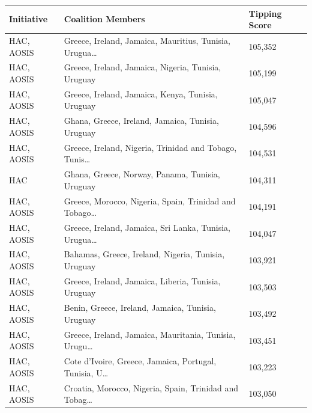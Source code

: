 \begin{tabular}{lll}
\toprule
Initiative & Coalition Members & Tipping Score \\
\midrule
HAC, AOSIS & Greece, Ireland, Jamaica, Mauritius, Tunisia, Urugua\ldots & 105,352 \\
HAC, AOSIS & Greece, Ireland, Jamaica, Nigeria, Tunisia, Uruguay & 105,199 \\
HAC, AOSIS & Greece, Ireland, Jamaica, Kenya, Tunisia, Uruguay & 105,047 \\
HAC, AOSIS & Ghana, Greece, Ireland, Jamaica, Tunisia, Uruguay & 104,596 \\
HAC, AOSIS & Greece, Ireland, Nigeria, Trinidad and Tobago, Tunis\ldots & 104,531 \\
HAC & Ghana, Greece, Norway, Panama, Tunisia, Uruguay & 104,311 \\
HAC, AOSIS & Greece, Morocco, Nigeria, Spain, Trinidad and Tobago\ldots & 104,191 \\
HAC, AOSIS & Greece, Ireland, Jamaica, Sri Lanka, Tunisia, Urugua\ldots & 104,047 \\
HAC, AOSIS & Bahamas, Greece, Ireland, Nigeria, Tunisia, Uruguay & 103,921 \\
HAC, AOSIS & Greece, Ireland, Jamaica, Liberia, Tunisia, Uruguay & 103,503 \\
HAC, AOSIS & Benin, Greece, Ireland, Jamaica, Tunisia, Uruguay & 103,492 \\
HAC, AOSIS & Greece, Ireland, Jamaica, Mauritania, Tunisia, Urugu\ldots & 103,451 \\
HAC, AOSIS & Cote d'Ivoire, Greece, Jamaica, Portugal, Tunisia, U\ldots & 103,223 \\
HAC, AOSIS & Croatia, Morocco, Nigeria, Spain, Trinidad and Tobag\ldots & 103,050 \\
\bottomrule
\end{tabular}

